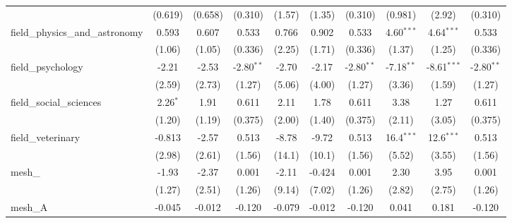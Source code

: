 \begin{tabular}{lccccccccc}
                                                               & (0.619)     & (0.658)       & (0.310)       & (1.57)   & (1.35)     & (0.310)       & (0.981)       & (2.92)        & (0.310)\\   
   field\_physics\_and\_astronomy                              & 0.593       & 0.607         & 0.533         & 0.766    & 0.902      & 0.533         & 4.60$^{***}$  & 4.64$^{***}$  & 0.533\\   
                                                               & (1.06)      & (1.05)        & (0.336)       & (2.25)   & (1.71)     & (0.336)       & (1.37)        & (1.25)        & (0.336)\\   
   field\_psychology                                           & -2.21       & -2.53         & -2.80$^{**}$  & -2.70    & -2.17      & -2.80$^{**}$  & -7.18$^{**}$  & -8.61$^{***}$ & -2.80$^{**}$\\   
                                                               & (2.59)      & (2.73)        & (1.27)        & (5.06)   & (4.00)     & (1.27)        & (3.36)        & (1.59)        & (1.27)\\   
   field\_social\_sciences                                     & 2.26$^{*}$  & 1.91          & 0.611         & 2.11     & 1.78       & 0.611         & 3.38          & 1.27          & 0.611\\   
                                                               & (1.20)      & (1.19)        & (0.375)       & (2.00)   & (1.40)     & (0.375)       & (2.11)        & (3.05)        & (0.375)\\   
   field\_veterinary                                           & -0.813      & -2.57         & 0.513         & -8.78    & -9.72      & 0.513         & 16.4$^{***}$  & 12.6$^{***}$  & 0.513\\   
                                                               & (2.98)      & (2.61)        & (1.56)        & (14.1)   & (10.1)     & (1.56)        & (5.52)        & (3.55)        & (1.56)\\   
   mesh\_                                                      & -1.93       & -2.37         & 0.001         & -2.11    & -0.424     & 0.001         & 2.30          & 3.95          & 0.001\\   
                                                               & (1.27)      & (2.51)        & (1.26)        & (9.14)   & (7.02)     & (1.26)        & (2.82)        & (2.75)        & (1.26)\\   
   mesh\_A                                                     & -0.045      & -0.012        & -0.120        & -0.079   & -0.012     & -0.120        & 0.041         & 0.181         & -0.120\\   

\end{tabular}
